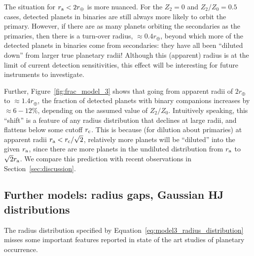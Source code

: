 \documentclass[12pt,modern]{aastex61}
\renewcommand{\a}{_{\rm a}}
\begin{document}
The situation for $r\a < 2r_\oplus$ is more nuanced.
For the $Z_2=0$ and $Z_2/Z_0=0.5$ cases, detected planets in binaries are 
still always more likely to orbit the primary.
However, if there are as many planets orbiting the secondaries as the 
primaries, then there is a turn-over radius, $\approx 0.4r_\oplus$, 
beyond which more of the detected planets in binaries come from secondaries: 
they have all been ``diluted down'' from larger true planetary radii!
Although this (apparent) radius is at the limit of current detection 
sensitivities, this effect will be interesting for future instruments to 
investigate.

Further, Figure~\ref{fig:frac_model_3} shows that going from apparent 
radii of $2r_\oplus$ to $\approx 1.4r_\oplus$, the fraction of detected 
planets with binary companions increases by $\approx 6-12\%$, depending on the 
assumed value of $Z_2/Z_0$. %
Intuitively speaking, this ``shift'' is a feature of any radius distribution 
that declines at large radii, and flattens below some cutoff $r_{\rm c}$.
This is because (for dilution about primaries)
at apparent radii $r\a < r_{\rm c}/\sqrt{2}$, relatively more planets will be 
``diluted'' into the given $r\a$, since there are more planets in 
the undiluted distribution from $r\a$ to $\sqrt{2}r\a$.
We compare this prediction with recent observations in 
Section~\ref{sec:discussion}.



\subsection{Further models: radius gaps, Gaussian HJ distributions}
\label{sec:further_models}

The radius distribution specified by 
Equation~\ref{eq:model3_radius_distribution} 
misses some important features reported in state of the art 
studies of planetary occurrence.
\end{document}
